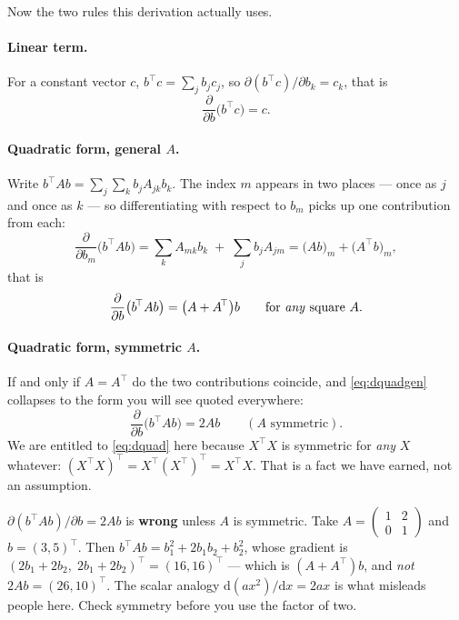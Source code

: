 \documentclass[11pt]{article}
\newcommand{\Xt}{X^{\!\top}}
\begin{document}
Now the two rules this derivation actually uses.

\paragraph{Linear term.} For a constant vector $c$, $b^{\!\top}c = \sum_j
b_j c_j$, so $\partial(b^{\!\top}c)/\partial b_k = c_k$, that is
\begin{equation}
  \label{eq:dlin}
  \frac{\partial}{\partial b}\bigl(b^{\!\top}c\bigr) = c .
\end{equation}

\paragraph{Quadratic form, general $A$.} Write
$b^{\!\top}Ab = \sum_j\sum_k b_j A_{jk} b_k$. The index $m$ appears in two
places --- once as $j$ and once as $k$ --- so differentiating with respect to
$b_m$ picks up one contribution from each:
\[
  \frac{\partial}{\partial b_m}\bigl(b^{\!\top}Ab\bigr)
  = \sum_k A_{mk}b_k \;+\; \sum_j b_j A_{jm}
  = \bigl(Ab\bigr)_m + \bigl(A^{\!\top}b\bigr)_m ,
\]
that is
\begin{equation}
  \label{eq:dquadgen}
  \frac{\partial}{\partial b}\bigl(b^{\!\top}Ab\bigr) = \bigl(A + A^{\!\top}\bigr)b
  \qquad\text{for \emph{any} square } A .
\end{equation}

\paragraph{Quadratic form, symmetric $A$.} If and only if $A = A^{\!\top}$ do
the two contributions coincide, and \eqref{eq:dquadgen} collapses to the form
you will see quoted everywhere:
\begin{equation}
  \label{eq:dquad}
  \frac{\partial}{\partial b}\bigl(b^{\!\top}Ab\bigr) = 2Ab
  \qquad (A \text{ symmetric}).
\end{equation}
We are entitled to \eqref{eq:dquad} here because $\Xt X$ is symmetric for
\emph{any} $X$ whatever: $(\Xt X)^{\!\top} = \Xt (\Xt)^{\!\top} = \Xt X$. That
is a fact we have earned, not an assumption.

\begin{caution}
$\partial(b^{\!\top}Ab)/\partial b = 2Ab$ is \textbf{wrong} unless $A$ is
symmetric. Take $A = \left(\begin{smallmatrix}1 & 2\\ 0 & 1\end{smallmatrix}\right)$ and
$b = (3,5)^{\!\top}$. Then $b^{\!\top}Ab = b_1^2 + 2b_1b_2 + b_2^2$, whose
gradient is $(2b_1 + 2b_2,\; 2b_1 + 2b_2)^{\!\top} = (16, 16)^{\!\top}$ ---
which is $(A + A^{\!\top})b$, and \emph{not} $2Ab = (26, 10)^{\!\top}$. The
scalar analogy $\mathrm{d}(ax^2)/\mathrm{d}x = 2ax$ is what misleads people
here. Check symmetry before you use the factor of two.
\end{caution}
\end{document}
